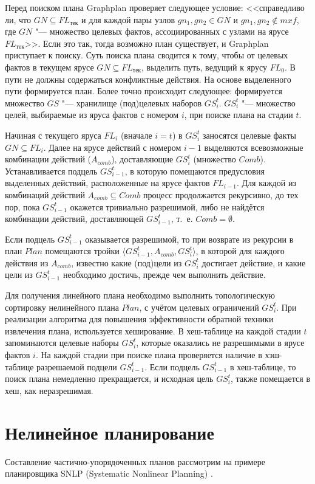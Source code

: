 \documentclass[b5paper,11pt]{book}
\begin{document}
	Перед поиском плана Graphplan проверяет следующее условие: <<справедливо ли, что $GN\subseteq FL_{\text{тек}}$ и для каждой пары узлов $gn_1,gn_2\in GN$ и $gn_1,gn_2\not\in mxf$, где $GN$ "--- множество целевых фактов, ассоциированных с узлами на ярусе $FL_{\text{тек}}$>>. Если это так, тогда возможно план существует, и Graphplan приступает к поиску. Суть поиска плана сводится к тому, чтобы от целевых фактов в текущем ярусе $GN\subseteq FL_{\text{тек}}$, выделить путь, ведущий к ярусу $FL_0$. В пути не
	должны содержаться конфликтные действия. На основе выделенного пути	формируется план. Более точно происходит следующее: формируется множество $GS$ "--- хранилище (под)целевых наборов $GS_i^t$. $GS_i^t$ "--- множество целей, выбираемые из яруса фактов с номером $i$,
	при поиске плана на стадии $t$.
	
	Начиная с текущего яруса $FL_i$ (вначале $i = t$) в $GS_i^t$ заносятся целевые факты $GN\subseteq FL_i$. Далее на ярусе действий с номером $i-1$ выделяются всевозможные комбинации действий ($A_{comb}$), доставляющие $GS_i^t$ (множество $Comb$). Устанавливается подцель $GS_{i-1}^t$, в которую помещаются предусловия выделенных действий, расположенные на ярусе фактов $FL_{i-1}$. Для каждой из комбинаций действий $A_{comb}\subseteq Comb$ процесс продолжается рекурсивно, до тех пор, пока $GS_{i-1}^t$ окажется тривиально разрешимой, либо не найдётся комбинации действий, доставляющей $GS_{i-1}^t$, т.~е. $Comb = \emptyset$.
	
	Если подцель $GS_{i-1}^t$ оказывается разрешимой, то при возврате из рекурсии в план $Plan$ помещаются тройки $\langle GS_{i-1}^t, A_{comb}, GS_i^t\rangle$, в которой для каждого действия из $A_{comb}$, известно какие (под)цели из $GS_i^t$ достигает действие, и какие цели из $GS_{i-1}^t$ необходимо достичь, прежде чем выполнить действие. 
	
	Для получения линейного плана необходимо выполнить топологическую сортировку нелинейного плана $Plan$, с учётом целевых ограничений $GS_i^t$. При реализации алгоритма для повышения эффективности обратной техники извлечения плана, используется хеширование. В хеш-таблице на каждой стадии $t$ запоминаются целевые наборы $GS_i^t$, которые оказались не разрешимыми в ярусе фактов $i$. На каждой стадии при поиске плана проверяется наличие в хэш-таблице разрешаемой подцели $GS_{i-1}^t$. Если подцель $GS_{i-1}^t$ в хеш-таблице, то поиск плана немедленно прекращается, и исходная цель $GS_i^t$, также помещается в хеш, как неразрешимая.
	
	\section{Нелинейное планирование}
		Составление частично-упорядоченных планов рассмотрим на примере планировщика SNLP (Systematic Nonlinear Planning) \cite{McAllester1991}. 
		
\end{document}
